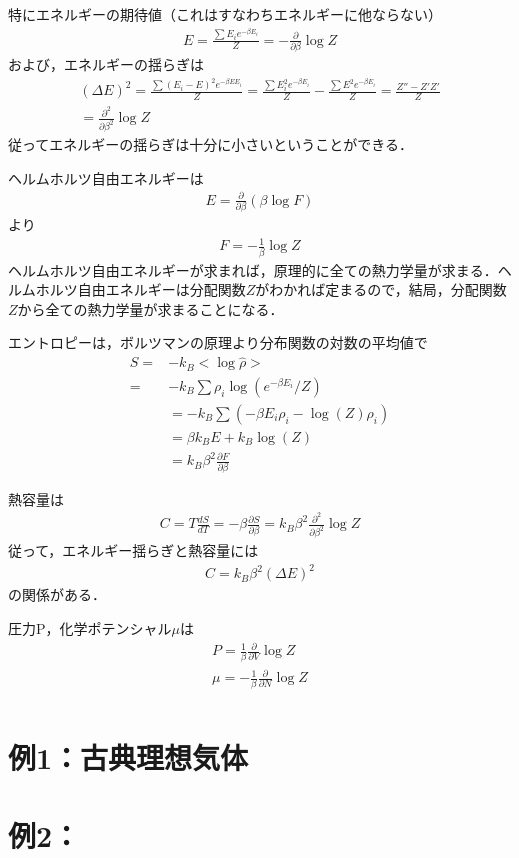 \documentclass[a4j]{jarticle}
\begin{document}
特にエネルギーの期待値（これはすなわちエネルギーに他ならない）
\begin{align*}
 E=\frac{\sum E_ie^{-\beta E_i}}{Z}=-\frac{\partial }{\partial \beta}\log Z
\end{align*}
および，エネルギーの揺らぎは
\begin{align*}
 (\Delta E)^2=\frac{\sum (E_i-E)^2e^{-\beta EE_i}}{Z}=\frac{\sum E_i^2e^{-\beta E_i}}{Z}-\frac{\sum E^2e^{-\beta E_i}}{Z}=\frac{Z''-Z'Z'}{Z} \\
 =\frac{\partial^2}{\partial \beta^2}\log Z
\end{align*}
従ってエネルギーの揺らぎは十分に小さいということができる．


ヘルムホルツ自由エネルギーは
\begin{align*}
 E=\frac{\partial}{\partial \beta}(\beta\log F)
\end{align*}
より
\begin{align*}
 F=-\frac{1}{\beta}\log Z
\end{align*}
ヘルムホルツ自由エネルギーが求まれば，原理的に全ての熱力学量が求まる．ヘルムホルツ自由エネルギーは分配関数$Z$がわかれば定まるので，結局，分配関数$Z$から全ての熱力学量が求まることになる．


エントロピーは，ボルツマンの原理より分布関数の対数の平均値で
\begin{align*}
 S=&-k_B<\log \hat{\rho}> \\
 =&-k_B\sum \rho_i\log(e^{-\beta E_i}/Z) \\
 &=-k_B\sum( -\beta E_i\rho_i-\log(Z)\rho_i) \\
 &=\beta k_BE+k_B\log(Z) \\
 &=k_B\beta^2\frac{\partial F}{\partial \beta}
\end{align*}

熱容量は
\begin{align*}
 C=T\frac{dS}{dT}=-\beta\frac{\partial S}{\partial \beta}=k_B\beta^2\frac{\partial^2}{\partial \beta^2}\log Z
\end{align*}
従って，エネルギー揺らぎと熱容量には
\begin{align*}
 C=k_B\beta^2(\Delta E)^2
\end{align*}
の関係がある．

圧力P，化学ポテンシャル$\mu$は
\begin{align*}
 P=\frac{1}{\beta}\frac{\partial}{\partial V}\log Z\\
  \mu=-\frac{1}{\beta}\frac{\partial}{\partial N}\log Z\\
\end{align*}

\section{例1：古典理想気体}

\section{例2：}
\end{document}
